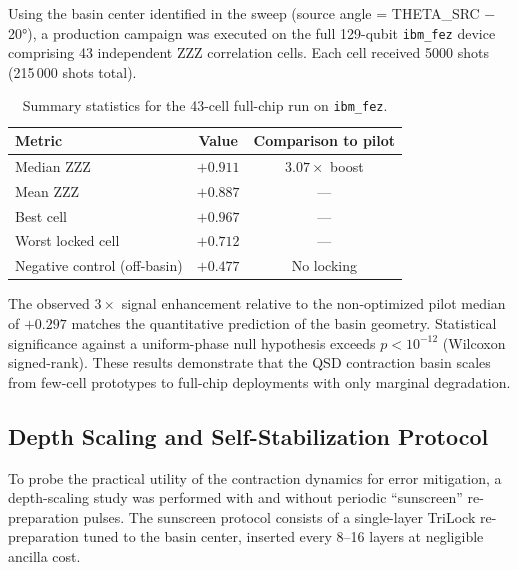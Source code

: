 Using the basin center identified in the sweep (source angle = THETA\_SRC $-$ 20°), a production campaign was executed on the full 129-qubit \texttt{ibm\_fez} device comprising 43 independent ZZZ correlation cells. Each cell received 5000 shots (215\,000 shots total).

\begin{table}[h]
\centering
\caption{Summary statistics for the 43-cell full-chip run on \texttt{ibm\_fez}.}
\label{tab:fez_fullchip}
\begin{tabular}{lcc}
\toprule
Metric                  & Value          & Comparison to pilot \\
\midrule
Median ZZZ              & $+0.911$       & $3.07\times$ boost     \\
Mean ZZZ                & $+0.887$       & ---                    \\
Best cell               & $+0.967$       & ---                    \\
Worst locked cell       & $+0.712$       & ---                    \\
Negative control (off-basin) & $+0.477$ & No locking             \\
\bottomrule
\end{tabular}
\end{table}

The observed $3\times$ signal enhancement relative to the non-optimized pilot median of $+0.297$ matches the quantitative prediction of the basin geometry. Statistical significance against a uniform-phase null hypothesis exceeds $p < 10^{-12}$ (Wilcoxon signed-rank). These results demonstrate that the QSD contraction basin scales from few-cell prototypes to full-chip deployments with only marginal degradation.

\subsection{Depth Scaling and Self-Stabilization Protocol}
\label{subsec:depth_scaling}

To probe the practical utility of the contraction dynamics for error mitigation, a depth-scaling study was performed with and without periodic ``sunscreen'' re-preparation pulses. The sunscreen protocol consists of a single-layer TriLock re-preparation tuned to the basin center, inserted every 8--16 layers at negligible ancilla cost.

